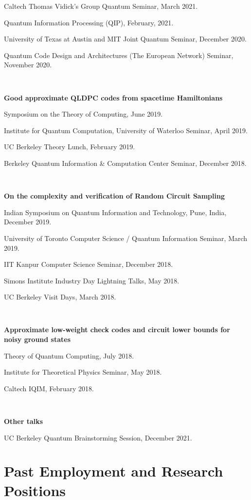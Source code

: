 \documentclass[11pt]{article}
\begin{document}
Caltech Thomas Vidick's Group Quantum Seminar, March 2021.

Quantum Information Processing (QIP), February, 2021.

University of Texas at Austin and MIT Joint Quantum Seminar, December 2020. 

Quantum Code Design and Architectures (The European Network) Seminar, November 2020.

\

\textbf{Good approximate QLDPC codes from spacetime Hamiltonians}

Symposium on the Theory of Computing, June 2019.

Institute for Quantum Computation, University of Waterloo Seminar, April 2019.

UC Berkeley Theory Lunch, February 2019.

Berkeley Quantum Information \& Computation Center Seminar, December 2018.

\

\textbf{On the complexity and verification of Random Circuit Sampling}

Indian Symposium on Quantum Information and Technology, Pune, India, December 2019.

University of Toronto Computer Science / Quantum Information Seminar, March 2019.

IIT Kanpur Computer Science Seminar, December 2018.

Simons Institute Industry Day Lightning Talks, May 2018.

UC Berkeley Visit Days, March 2018.

\

\textbf{Approximate low-weight check codes and circuit lower bounds for noisy ground states}

Theory of Quantum Computing, July 2018.

Institute for Theoretical Physics Seminar, May 2018.

Caltech IQIM, February 2018.

\

\textbf{Other talks}

UC Berkeley Quantum Brainstorming Session, December 2021.







\section{Past Employment and Research Positions}
\end{document}
